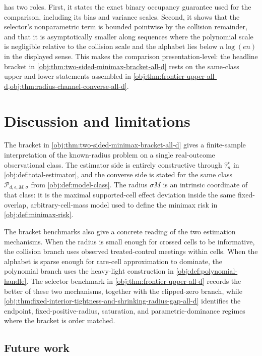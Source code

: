\documentclass[11pt]{article}
\begin{document}
 has two roles. First, it states the exact binary occupancy guarantee used for the comparison, including its bias and variance scales. Second, it shows that the selector's nonparametric term is bounded pointwise by the collision remainder, and that it is asymptotically smaller along sequences where the polynomial scale is negligible relative to the collision scale and the alphabet lies below \(n\log(en)\) in the displayed sense. This makes the comparison presentation-level: the headline bracket in \cref{obj:thm:two-sided-minimax-bracket-all-d} rests on the same-class upper and lower statements assembled in \cref{obj:thm:frontier-upper-all-d,obj:thm:radius-channel-converse-all-d}.


\section{Discussion and limitations}

The bracket in \cref{obj:thm:two-sided-minimax-bracket-all-d} gives a finite-sample interpretation of the known-radius problem on a single real-outcome observational class. The estimator side is entirely constructive through \(\widehat\tau_n^{\star}\) in \cref{obj:def:total-estimator}, and the converse side is stated for the same class \(\mathcal P_{d,\epsilon,M,\sigma}\) from \cref{obj:def:model-class}. The radius \(\sigma M\) is an intrinsic coordinate of that class: it is the maximal supported-cell effect deviation inside the same fixed-overlap, arbitrary-cell-mass model used to define the minimax risk in \cref{obj:def:minimax-risk}.

The bracket benchmarks also give a concrete reading of the two estimation mechanisms. When the radius is small enough for crossed cells to be informative, the collision branch uses observed treated-control meetings within cells. When the alphabet is sparse enough for rare-cell approximation to dominate, the polynomial branch uses the heavy-light construction in \cref{obj:def:polynomial-handle}. The selector benchmark in \cref{obj:thm:frontier-upper-all-d} records the better of these two mechanisms, together with the clipped-zero branch, while \cref{obj:thm:fixed-interior-tightness-and-shrinking-radius-gap-all-d} identifies the endpoint, fixed-positive-radius, saturation, and parametric-dominance regimes where the bracket is order matched.

\subsection{Future work}
\end{document}
